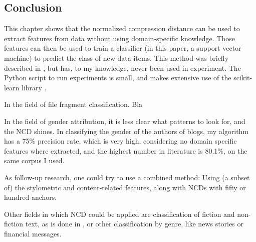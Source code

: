 \subsection{Conclusion}

This chapter shows that the normalized compression distance can be used to extract features from data without using domain-specific knowledge. Those features can then be used to train a classifier (in this paper, a support vector machine) to predict the class of new data items. This method was briefly described in \cite{Cilibrasi2007}, but has, to my knowledge, never been used in experiment. The Python script to run experiments is small, and makes extensive use of the scikit-learn library \cite{Pedregosa2011}.

In the field of file fragment classification. Bla

In the field of gender attribution, it is less clear what patterns to look for, and the NCD shines. In classifying the gender of the authors of blogs, my algorithm has a 75\% precision rate, which is very high, considering no domain specific features where extracted, and the highest number in literature is 80.1\%, on the same corpus I used.

As follow-up research, one could try to use a combined method: Using (a subset of) the stylometric and content-related features, along with NCDs with fifty or hundred anchors.

Other fields in which NCD could be applied are classification of fiction and non-fiction text, as is done in \cite{Koppel2002}, or other classification by genre, like news stories or financial messages.
